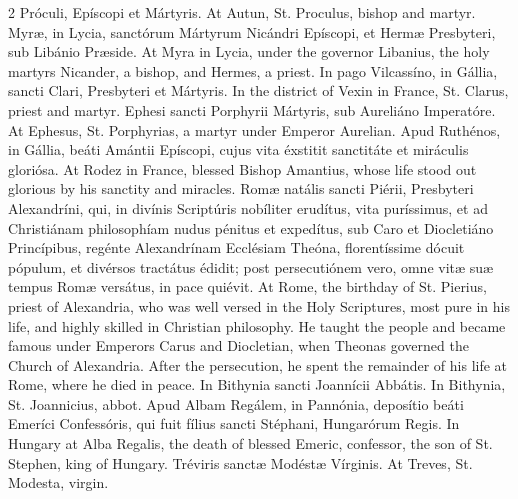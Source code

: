 \begin{paracol}{2}
 Próculi, Epíscopi et Mártyris.
\switchcolumn
{}
At Autun, St. Proculus, bishop and 
 martyr.
\switchcolumn*
{}
Myræ, in Lycia, 
 sanctórum Mártyrum Nicándri Epíscopi, et Hermæ Presbyteri, sub Libánio 
 Præside.
\switchcolumn
{}
At Myra in Lycia, under the governor 
 Libanius, the holy martyrs Nicander, a bishop, and Hermes, a priest.
\switchcolumn*
{}
In pago Vilcassíno, in 
 Gállia, sancti Clari, Presbyteri et Mártyris.
\switchcolumn
{}
In the district of Vexin in France, 
 St. Clarus, priest and martyr.
\switchcolumn*
{}
Ephesi sancti Porphyrii 
 Mártyris, sub Aureliáno Imperatóre.
\switchcolumn
{}
At Ephesus, St. Porphyrias, a martyr 
 under Emperor Aurelian.
\switchcolumn*
{}
Apud Ruthénos, in 
 Gállia, beáti Amántii Epíscopi, cujus vita éxstitit sanctitáte et miráculis 
 gloriósa.
\switchcolumn
{}
At Rodez in France, blessed Bishop 
 Amantius, whose life stood out glorious by his sanctity and miracles.
\switchcolumn*
{}
Romæ natális sancti 
 Piérii, Presbyteri Alexandríni, qui, in divínis Scriptúris nobíliter 
 erudítus, vita puríssimus, et ad Christiánam philosophíam nudus pénitus et 
 expedítus, sub Caro et Diocletiáno Princípibus, regénte Alexandrínam 
 Ecclésiam Theóna, florentíssime dócuit pópulum, et divérsos tractátus édidit; 
 post persecutiónem vero, omne vitæ suæ tempus Romæ versátus, in pace quiévit.
\switchcolumn
{}
At Rome, the birthday of St. Pierius, 
 priest of Alexandria, who was well versed in the Holy Scriptures, most pure 
 in his life, and highly skilled in Christian philosophy. He taught the 
 people and became famous under Emperors Carus and Diocletian, when Theonas 
 governed the Church of Alexandria. After the persecution, he spent the 
 remainder of his life at Rome, where he died in peace.
\switchcolumn*
{}
In Bithynia sancti 
 Joannícii Abbátis.
\switchcolumn
{}
In Bithynia, St. Joannicius, abbot.
\switchcolumn*
{}
Apud Albam Regálem, in 
 Pannónia, deposítio beáti Emeríci Confessóris, qui fuit fílius sancti 
 Stéphani, Hungarórum Regis.
\switchcolumn
{}
In Hungary at Alba Regalis, the 
 death of blessed Emeric, confessor, the son of St. Stephen, king of Hungary.
\switchcolumn*
{}
Tréviris sanctæ Modéstæ 
 Vírginis.
\switchcolumn
{}
At Treves, St. Modesta, virgin.
\switchcolumn*
{}
\end{paracol}


